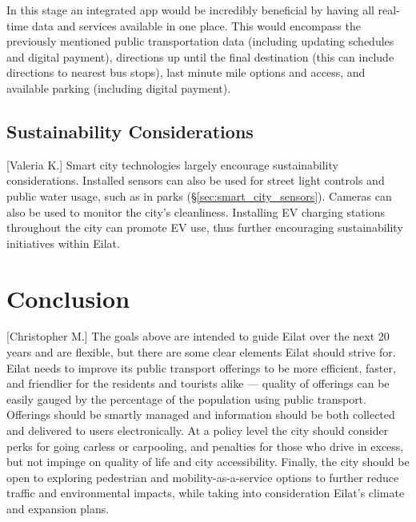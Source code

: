\documentclass[12pt]{article}                       %
\begin{document}
In this stage an integrated app would be incredibly beneficial by having all real-time data and services available in one place. This would encompass the previously mentioned public transportation data (including updating schedules and digital payment), directions up until the final destination (this can include directions to nearest bus stops), last minute mile options and access, and available parking (including digital payment).



\subsection{Sustainability Considerations}[Valeria K.]
Smart city technologies largely encourage sustainability considerations. Installed sensors can also be used for street light controls and public water usage, such as in parks (\S\ref{sec:smart_city_sensors}). Cameras can also be used to monitor the city's cleanliness. Installing EV charging stations throughout the city can promote EV use, thus further encouraging sustainability initiatives within Eilat. 

\section{Conclusion}[Christopher M.]
The goals above are intended to guide Eilat over the next 20 years and are flexible, but there are some clear elements Eilat should strive for. Eilat needs to improve its public transport offerings to be more efficient, faster, and friendlier for the residents and tourists alike --- quality of offerings can be easily gauged by the percentage of the population using public transport. Offerings should be smartly managed and information should be both collected and delivered to users electronically. At a policy level the city should consider perks for going carless or carpooling, and penalties for those who drive in excess, but not impinge on quality of life and city accessibility. Finally, the city should be open to exploring pedestrian and mobility-as-a-service options to further reduce traffic and environmental impacts, while taking into consideration Eilat's climate and expansion plans.


\newpage


\end{document}
